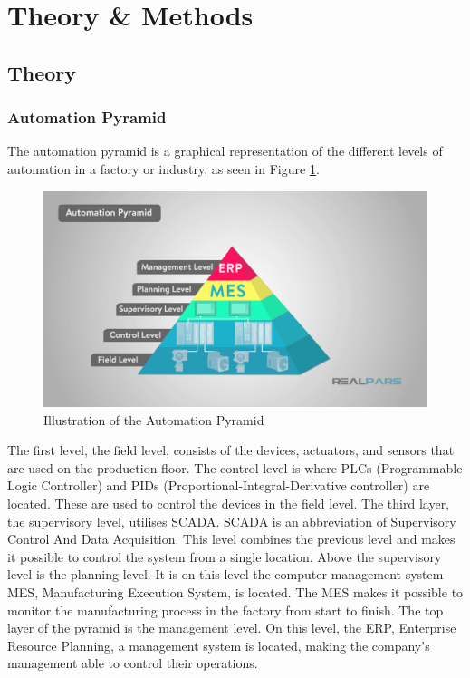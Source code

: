 \section{Theory \& Methods}
\subsection{Theory}
\subsubsection{Automation Pyramid}
The automation pyramid is a graphical representation of the different levels of
automation in a factory or industry, as seen in Figure \ref{figure:ap}.

\begin{figure}[ht]
	\centering 
	\includegraphics[width=1\linewidth]{images/automation_pyramid}
	\caption{Illustration of the Automation Pyramid}
	\label{figure:ap}
\end{figure}


The first level, the field level, consists of the devices, actuators, and
sensors that are used on the production floor. The control level is where PLCs
(Programmable Logic Controller) and PIDs (Proportional-Integral-Derivative
controller) are located. These are used to control the devices in the field
level. The third layer, the supervisory level, utilises SCADA. SCADA
is an abbreviation of Supervisory Control And Data Acquisition. This level
combines the previous level and makes it possible to control the system from
a single location. Above the supervisory level is the planning level. It is on
this level the computer management system MES, Manufacturing Execution System,
is located. The MES makes it possible to monitor the manufacturing process in
the factory from start to finish. The top layer of the pyramid is the management
level. On this level, the ERP, Enterprise Resource Planning, a management system
is located, making the company's management able to control their operations. \cite{ap}\\

